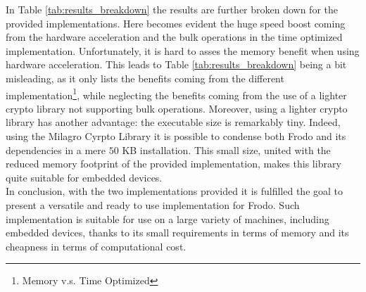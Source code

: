 In Table \ref{tab:results_breakdown} the results are further broken down for the provided implementations. Here becomes evident the huge speed boost coming from the hardware acceleration and the bulk operations in the time optimized implementation. Unfortunately, it is hard to asses the memory benefit when using hardware acceleration. This leads to Table \ref{tab:results_breakdown} being a bit misleading, as it only lists the benefits coming from the different implementation\footnote{Memory v.s. Time Optimized}, while neglecting the benefits coming from the use of a lighter crypto library not supporting bulk operations. Moreover, using a lighter crypto library has another advantage: the executable size is remarkably tiny. Indeed, using the Milagro Cyrpto Library it is possible to condense both Frodo and its dependencies in a mere $50$ KB installation. This small size, united with the reduced memory footprint of the provided implementation, makes this library quite suitable for embedded devices.\\
In conclusion, with the two implementations provided it is fulfilled the goal to present a versatile and ready to use implementation for Frodo. Such implementation is suitable for use on a large variety of machines, including embedded devices, thanks to its small requirements in terms of memory and its cheapness in terms of computational cost.


